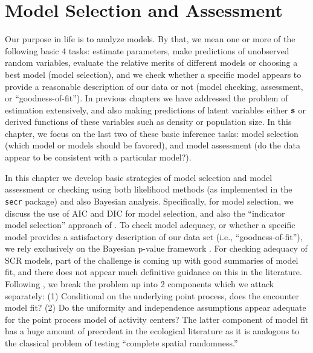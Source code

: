 \chapter{
Model Selection and Assessment
}
\label{chapt.gof}

\vspace{.3in}

Our purpose in life is to analyze models. By that, we mean one or more
of the following basic 4 tasks: estimate parameters, make predictions
of unobserved random variables, evaluate the
relative merits of different models or choosing a best model (model
selection), and we check whether a specific model appears to provide a
reasonable description of our data or not (model checking, assessment,
or ``goodness-of-fit'').  In previous
chapters we have addressed the problem of estimation extensively, and
also making predictions of latent variables either ${\bf s}$ or
derived functions of these variables such as density or population
size.  In this chapter, we focus on the last two of these basic
inference tasks: model selection (which model or models should be
favored), and model assessment (do the data appear to be consistent
with a particular model?).


In this chapter we develop basic strategies of model selection and
model assessment or checking using both likelihood methods (as
implemented in the \mbox{\tt secr} package) and also Bayesian
analysis.  
Specifically, for model selection, we discuss the use of AIC and DIC for model
selection, and also the ``indicator model selection'' approach of
\citet{kuo_mallick:1998}.  To check model adequacy, or whether a
specific model provides a satisfactory description of our data set
(i.e., ``goodness-of-fit''), we rely exclusively on the Bayesian
p-value framework \citep{gelman_etal:1996}.  For checking adequacy of
SCR models, part of the challenge is coming up with good summaries of
model fit, and there does not appear much definitive guidance on this
in the literature.  Following \citet{royle_etal:2011mee}, we break the
problem up into 2 components which we attack separately: (1)
Conditional on the underlying point process, does the encounter model
fit? (2) Do the uniformity and independence assumptions appear
adequate for the point process model of activity centers? The latter
component of model fit has a huge amount of precedent in the
ecological literature as it is analogous to the classical problem of
testing ``complete spatial randomness.''


